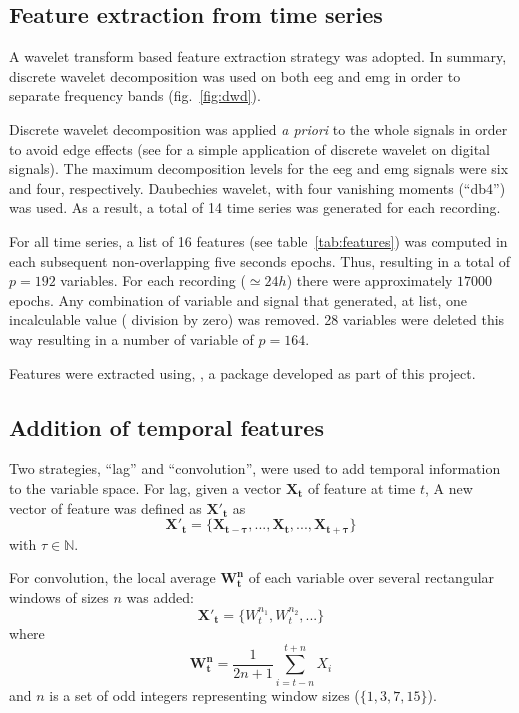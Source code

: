 \subsection{Feature extraction from time series}
\label{sub:features}

A wavelet transform based feature extraction strategy was adopted.
In summary, discrete wavelet decomposition was used on both \gls{eeg} and \gls{emg}
in order to separate frequency bands (fig.~\ref{fig:dwd}).



Discrete wavelet decomposition was applied \emph{a priori} to the whole signals
in order to avoid edge effects (see \cite{prabhakar_application_2002} for a
simple application of discrete wavelet on digital signals).
The maximum decomposition levels for the \gls{eeg} and \gls{emg} signals were six and four, respectively.
Daubechies wavelet, with four vanishing moments (``db4'') was used.
As a result, a total of 14 time series was generated for each recording.

For all time series, a list of 16 features (see table~\ref{tab:features}) was computed in each subsequent non-overlapping five seconds epochs.
Thus, resulting in a total of $p=192$ variables. 
For each recording ($\simeq 24h$) there were approximately $17000$ epochs.
Any combination of variable and signal that generated, at list, one incalculable value (\eg{} division by zero) was removed.
28 variables were deleted this way resulting in a number of variable of $p=164$.



Features were extracted using, \pr{}, a \py{} package developed as part of this project.


\subsection{Addition of temporal features}
Two strategies, ``lag'' and ``convolution'', were used to add temporal
information to the variable space\cite{dietterich_machine_2002}.
For lag, given a vector $\mathbf{X_t}$ of feature at time $t$,
A new vector of feature was defined as $\mathbf{{X'}_t}$ as
\begin{equation}
\mathbf{{X'}_t} = \{\mathbf{X_{t-\tau}}, ..., \mathbf{X_t}, ..., \mathbf{X_{t+\tau}}\}
\label{eq:tau}
\end{equation}
with $\tau \in \mathbb{N}$.

For convolution, the local average $\mathbf{W^n_t}$ of each variable over several rectangular windows of sizes $n$ was added:
\begin{equation}
\mathbf{{X'}_t} = \{W^{n_1}_t, W^{n_2}_t, ...\}
\label{eq:window}
\end{equation}
where
\[
\mathbf{W^n_t} = \frac{1}{2n+1} \sum_{i = t-n}^{t+n}{X_i}
\]
and $n$ is a set of odd integers representing window sizes (\eg $\{1,3,7,15\}$).



